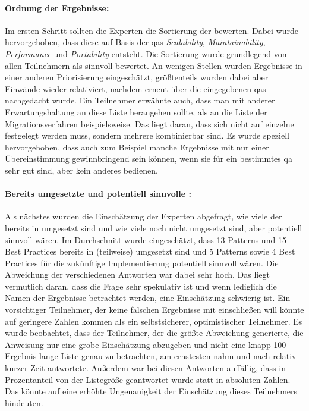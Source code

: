 \paragraph{Ordnung der Ergebnisse:} Im ersten Schritt sollten die Experten die Sortierung der \bpp bewerten.
Dabei wurde hervorgehoben, dass diese auf Basis der \glspl{qa} \emph{Scalability}, \emph{Maintainability}, \emph{Performance} und \emph{Portability} entsteht.
Die Sortierung wurde grundlegend von allen Teilnehmern als sinnvoll bewertet.
An wenigen Stellen wurden Ergebnisse in einer anderen Priorisierung eingeschätzt, größtenteils wurden dabei aber Einwände wieder relativiert, nachdem erneut über die eingegebenen \glspl{qa} nachgedacht wurde.
Ein Teilnehmer erwähnte auch, dass man mit anderer Erwartungshaltung an diese Liste herangehen sollte, als an die Liste der Migrationsverfahren beispielsweise.
Das liegt daran, dass sich nicht auf einzelne \bpp festgelegt werden muss, sondern mehrere kombinierbar sind.
Es wurde speziell hervorgehoben, dass auch zum Beispiel manche Ergebnisse mit nur einer Übereinstimmung gewinnbringend sein können, wenn sie für ein bestimmtes \gls{qa} sehr gut sind, aber kein anderes bedienen.

\paragraph{Bereits umgesetzte und potentiell sinnvolle \bpp:}
Als nächstes wurden die Einschätzung der Experten abgefragt, wie viele der \bpp bereits in \jf umgesetzt sind und wie viele noch nicht umgesetzt sind, aber potentiell sinnvoll wären.
Im Durchschnitt wurde eingeschätzt, dass 13 Patterns und 15 Best Practices bereits in \jf (teilweise) umgesetzt sind und  5 Patterns sowie 4 Best Practices für die zukünftige Implementierung potentiell sinnvoll wären.
Die Abweichung der verschiedenen Antworten war dabei sehr hoch.
Das liegt vermutlich daran, dass die Frage sehr spekulativ ist und wenn lediglich die Namen der Ergebnisse betrachtet werden, eine Einschätzung schwierig ist.
Ein vorsichtiger Teilnehmer, der keine falschen Ergebnisse mit einschließen will könnte auf geringere Zahlen kommen als ein selbstsicherer, optimistischer Teilnehmer.
Es wurde beobachtet, dass der Teilnehmer, der die größte Abweichung generierte, die Anweisung nur eine grobe Einschätzung abzugeben und nicht eine knapp 100 Ergebnis lange Liste genau zu betrachten, am ernstesten nahm und nach relativ kurzer Zeit antwortete.
Außerdem war bei diesen Antworten auffällig, dass in Prozentanteil von der Listegröße geantwortet wurde statt in absoluten Zahlen.
Das könnte auf eine erhöhte Ungenauigkeit der Einschätzung dieses Teilnehmers hindeuten.

